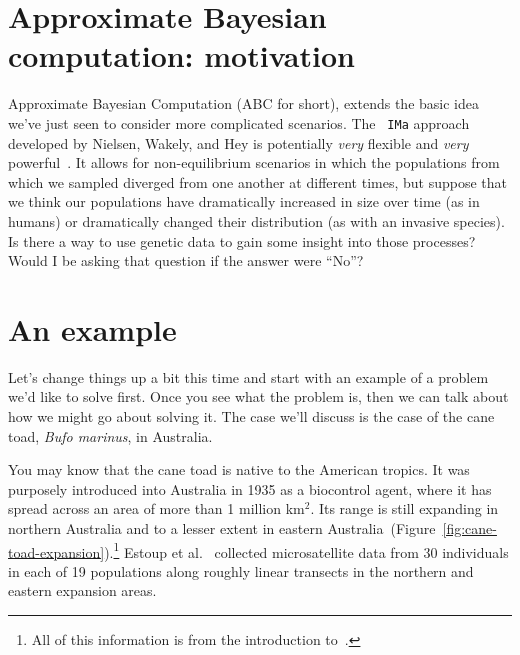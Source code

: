 \section*{Approximate Bayesian computation: motivation}

Approximate Bayesian Computation (ABC for short), extends the basic
idea we've just seen to consider more complicated scenarios. The {\tt
  IMa} approach developed by Nielsen, Wakely, and Hey is potentially
{\it very\/} flexible and {\it very\/}
powerful~\cite{Hey-Nielsen-2004,Hey-Nielsen-2007,Nielsen-Wakeley-2001}. It
allows for non-equilibrium scenarios in which the populations from
which we sampled diverged from one another at different times, but
suppose that we think our populations have dramatically increased in
size over time (as in humans) or dramatically changed their
distribution (as with an invasive species). Is there a way to use
genetic data to gain some insight into those processes? Would I be
asking that question if the answer were ``No''?

\section*{An example}

Let's change things up a bit this time and start with an example of a
problem we'd like to solve first. Once you see what the problem is,
then we can talk about how we might go about solving it. The case
we'll discuss is the case of the cane toad, {\it Bufo marinus}, in
Australia.

You may know that the cane toad is native to the American tropics. It
was purposely introduced into Australia in 1935 as a biocontrol agent,
where it has spread across an area of more than 1 million km$^2$. Its
range is still expanding in northern Australia and to a lesser extent
in eastern
Australia~(Figure~\ref{fig:cane-toad-expansion}).\footnote{All of this
  information is from the introduction to~\cite{Estoup-etal-2004}.}
Estoup et al.~\cite{Estoup-etal-2004} collected microsatellite data
from 30 individuals in each of 19 populations along roughly linear
transects in the northern and eastern expansion areas.

